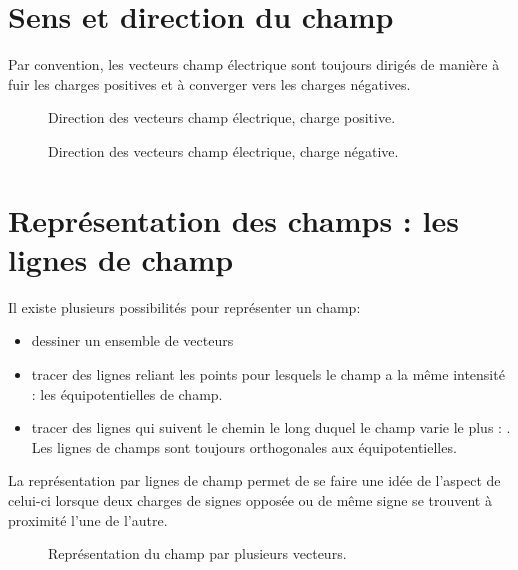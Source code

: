 \section{Sens et direction du champ}
Par convention, les vecteurs champ électrique sont toujours dirigés de manière à fuir les charges positives et à converger vers les charges négatives.
\begin{figure}[!ht]
    \centering
    \begin{minipage}[b]{.47\linewidth}
        \centering
        \resizebox{.8\linewidth}{!}{}
        \caption{Direction des vecteurs champ électrique, charge positive.}
        \label{vecteur_champ_q+}
    \end{minipage}
    \begin{minipage}[b]{.47\linewidth}
        \centering
        \resizebox{.8\linewidth}{!}{}
        \caption{Direction des vecteurs champ électrique, charge négative.}
        \label{vecteur_champ_q-}
    \end{minipage}
\end{figure}

\newpage

\section{Représentation des champs : les lignes de champ}
Il existe plusieurs possibilités pour représenter un champ:
\begin{itemize}[label=\textbullet]
    \item dessiner un ensemble de vecteurs
    \item tracer des lignes reliant les points pour lesquels le champ a la même intensité : les équipotentielles de champ.
    \item tracer des lignes qui suivent le chemin le long duquel le champ varie le plus : . Les lignes de champs sont toujours orthogonales aux équipotentielles.
\end{itemize}
La représentation par lignes de champ permet de se faire une idée de l'aspect de celui-ci lorsque deux charges de signes opposée ou de même signe se trouvent à proximité l'une de l'autre.

\newpage

\begin{figure}[!ht]
    \centering
    \resizebox{.6\linewidth}{!}{}
    \caption{Représentation du champ par plusieurs vecteurs.}
    \label{vecteurs_champ}
\end{figure}

